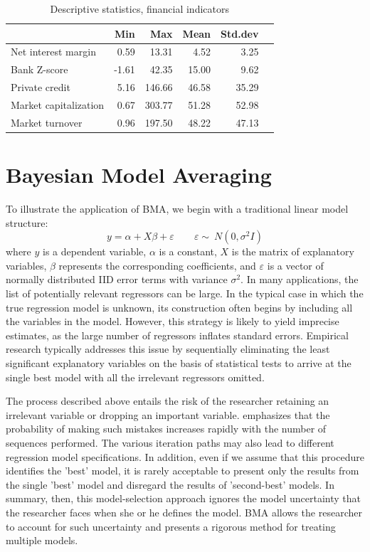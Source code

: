 \begin{table}[!ht]
	\caption{Descriptive statistics, financial indicators}
	\label{tab:descstat}
	\centering
	\begin{tabular}{lrrrrr}
		\toprule
		& Min & Max & Mean & Std.dev \\ 
		\midrule
		Net interest margin 		& 0.59 & 13.31 & 4.52 & 3.25 \\ 
		Bank Z-score				& -1.61 & 42.35 & 15.00 & 9.62 \\ 
		Private credit 			& 5.16 & 146.66 & 46.58 & 35.29 \\ 
		Market capitalization 	& 0.67 & 303.77 & 51.28 & 52.98 \\ 
		Market turnover 			& 0.96 & 197.50 & 48.22 & 47.13 \\ 
		\bottomrule
		
	\end{tabular}
\end{table}

\section{Bayesian Model Averaging}
\label{ch2sec:BMA}
To illustrate the application of BMA, we begin with a traditional linear model structure:
%
\begin{equation}\label{ch2eq:OLS}
	y = \alpha + X\beta+ \varepsilon \qquad \varepsilon  \sim\ N(0, \sigma^{2}I)
\end{equation}
%
where $y$ is a dependent variable, $\alpha$ is a constant, $X$ is the matrix of explanatory variables, $\beta$ represents the corresponding coefficients, and $\varepsilon$ is a vector of normally distributed IID error terms with variance $\sigma^{2}$. In many applications, the list of potentially relevant regressors can be large. In the typical case in which the true regression model is unknown, its construction often begins by including all the variables in the model. However, this strategy is likely to yield imprecise estimates, as the large number of regressors inflates standard errors. Empirical research typically addresses this issue by sequentially eliminating the least significant explanatory variables on the basis of statistical tests to arrive at the single best model with all the irrelevant regressors omitted.

The process described above entails the risk of the researcher retaining an irrelevant variable or dropping an important variable. \citet{Koop2003} emphasizes that the probability of making such mistakes increases rapidly with the number of sequences performed. The various iteration paths may also lead to different regression model specifications. In addition, even if we assume that this procedure identifies the 'best' model, it is rarely acceptable to present only the results from the single 'best' model and disregard the results of 'second-best' models. In summary, then, this model-selection approach ignores the model uncertainty that the researcher faces when she or he defines the model. \ac{BMA} allows the researcher to account for such uncertainty and presents a rigorous method for treating multiple models.

